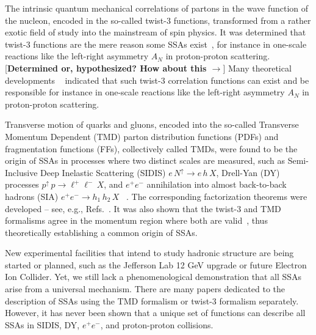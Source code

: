\documentclass[twocolumn,prl,aps,superscriptaddress
               ,footinbib,amsfonts,amsmath,amssymb,showpacs]{revtex4-1}
\newcommand{\red}[1]{{\color{red} {#1}}}
\newcommand{\green}[1]{{\color{PineGreen} {#1}}}
\newcommand{\com}[1]{{\color{red} [\textbf{#1}]}}
\begin{document}
The intrinsic quantum mechanical correlations of partons in the wave
function of the nucleon, encoded in \red{the} so-called twist-3 functions,
transformed from a rather exotic field of study into the mainstream of
spin physics. 
%
\green{
It was determined that twist-3 functions are the mere reason some SSAs
exist~\cite{Efremov:1981sh, Efremov:1984ip, Qiu:1991pp, Qiu:1998ia,
Kouvaris:2006zy, Eguchi:2006mc, Koike:2009ge, Metz:2012ct,
Kanazawa:2013uia, Beppu:2013uda},
for instance in one-scale reactions like the left-right asymmetry
$A_N$ in proton-proton scattering. 
}
\com{Determined or, hypothesized? How about this $\to$}
{\color{red}
Many theoretical developments 
~\cite{Efremov:1981sh, Efremov:1984ip, Qiu:1991pp, Qiu:1998ia,
Kouvaris:2006zy, Eguchi:2006mc, Koike:2009ge, Metz:2012ct,
Kanazawa:2013uia, Beppu:2013uda}
indicated that such twist-3 correlation functions 
can exist and be responsible 
for instance in one-scale reactions like the left-right asymmetry
$A_N$ in proton-proton scattering. 
}





Transverse motion of quarks and gluons, encoded into the so-called
Transverse Momentum Dependent (TMD) parton distribution functions
(PDFs) and fragmentation functions (FFs), collectively called TMDs,
were found to be the origin of SSAs in processes where two distinct
scales are measured, such as Semi-Inclusive Deep Inelastic Scattering
(SIDIS) $e\,N^\uparrow \to e\,h\,X$, Drell-Yan (DY) processes
$p^\uparrow \,p \to \ell^+\ell^-\, X$, 
and $e^+e^-$ annihilation into almost back-to-back hadrons (SIA) 
$e^+e^- \to h_1\,h_2\,X$
~\cite{Mulders:1995dh, Boer:1997mf, Bacchetta:2006tn,Arnold:2008kf, Pitonyak:2013dsu}.
%
The corresponding factorization theorems were developed -- see, e.g.,
Refs.~\cite{Collins:2011zzd,GarciaEchevarria:2011rb}.  
%
It was also shown that the twist-3 and TMD formalisms agree in the
momentum region where both are
valid~\cite{Ji:2006br, Koike:2007dg, Ji:2006ub,Yuan:2009dw,Zhou:2008fb,Zhou:2009jm}, thus theoretically establishing a common origin of SSAs. 

New experimental facilities that intend to study hadronic structure
are being started or planned, such as the Jefferson Lab 12 GeV upgrade
or future Electron Ion Collider.
%
Yet, we still lack a phenomenological demonstration that all SSAs
arise from a universal mechanism. 
%
There are many papers dedicated to the description of SSAs using the
TMD formalism or twist-3 formalism separately.  
%
However, it has never been shown that a unique set of functions can
describe all SSAs in SIDIS, DY, $e^+e^-$, and proton-proton
collisions. 
\end{document}
